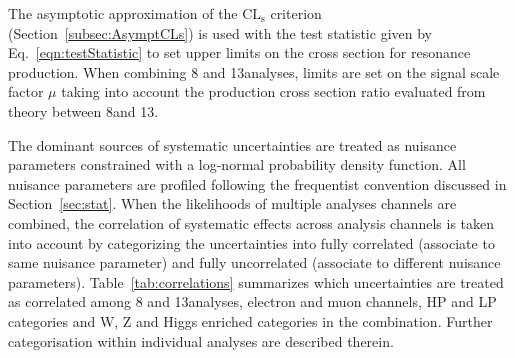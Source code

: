 The asymptotic approximation of the $\mathrm{CL_s}$ criterion (Section~\ref{subsec:AsymptCLs}) is used with the test statistic given by Eq.~\ref{eqn:testStatistic} to set upper limits on the cross section for resonance production.
When combining 8 and 13\TeV analyses, limits are set on the signal scale factor $\mu$ taking into account the production cross section ratio evaluated from theory between 8\TeV and 13\TeV.

The dominant sources of systematic uncertainties are treated as nuisance parameters constrained with a log-normal probability density function.
All nuisance parameters are profiled following the frequentist convention discussed in Section~\ref{sec:stat}.
When the likelihoods of multiple analyses channels are combined, the correlation of systematic effects across analysis channels is taken into account by categorizing the uncertainties into fully correlated (associate to same nuisance parameter) and fully uncorrelated (associate to different nuisance parameters).
Table~\ref{tab:correlations} summarizes which uncertainties are treated as correlated among 8 and 13\TeV analyses, electron and muon channels, HP and LP categories and W, Z and Higgs enriched categories in the combination.
Further categorisation within individual analyses are described therein.

